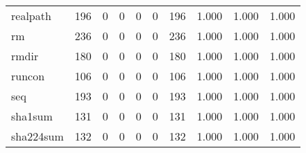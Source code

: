 \begin{longtable}{lp{2.0cm}p{2.0cm}p{2.0cm}p{2.0cm}p{2.0cm}p{2.0cm}p{2.0cm}p{2.0cm}p{2.0cm}}
realpath  &                    196 &                                  0 &                                 0 &                                0 &                                 0 &                             196 &                                1.000 &                                  1.000 &                                1.000 \\
rm        &                    236 &                                  0 &                                 0 &                                0 &                                 0 &                             236 &                                1.000 &                                  1.000 &                                1.000 \\
rmdir     &                    180 &                                  0 &                                 0 &                                0 &                                 0 &                             180 &                                1.000 &                                  1.000 &                                1.000 \\
runcon    &                    106 &                                  0 &                                 0 &                                0 &                                 0 &                             106 &                                1.000 &                                  1.000 &                                1.000 \\
seq       &                    193 &                                  0 &                                 0 &                                0 &                                 0 &                             193 &                                1.000 &                                  1.000 &                                1.000 \\
sha1sum   &                    131 &                                  0 &                                 0 &                                0 &                                 0 &                             131 &                                1.000 &                                  1.000 &                                1.000 \\
sha224sum &                    132 &                                  0 &                                 0 &                                0 &                                 0 &                             132 &                                1.000 &                                  1.000 &                                1.000 \\

\end{longtable}
